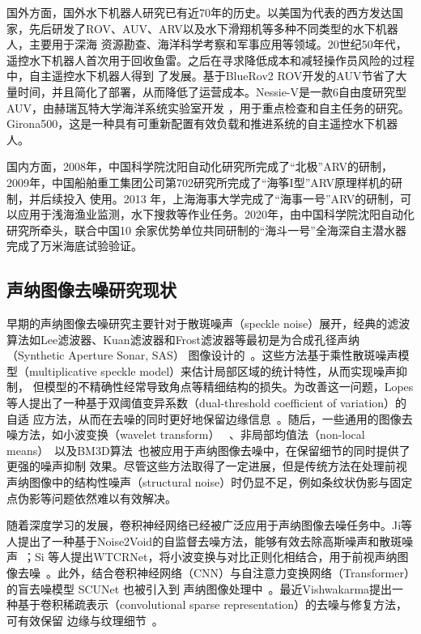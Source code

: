 国外方面，国外水下机器人研究已有近70年的历史。以美国为代表的西方发达国家，先后研发了ROV、AUV、ARV以及水下滑翔机等多种不同类型的水下机器人，主要用于深海
资源勘查、海洋科学考察和军事应用等领域。20世纪50年代，遥控水下机器人首次用于回收鱼雷。之后在寻求降低成本和减轻操作员风险的过程中，自主遥控水下机器人得到
了发展。基于BlueRov2 ROV开发的AUV节省了大量时间，并且简化了部署，从而降低了运营成本。Nessie-V是一款6自由度研究型AUV，由赫瑞瓦特大学海洋系统实验室开发
，用于重点检查和自主任务的研究。Girona500，这是一种具有可重新配置有效负载和推进系统的自主遥控水下机器人。

国内方面，2008年，中国科学院沈阳自动化研究所完成了“北极”ARV的研制，2009年，中国船舶重工集团公司第702研究所完成了“海筝I型”ARV原理样机的研制，并后续投入
使用。2013 年，上海海事大学完成了“海事一号”ARV的研制，可以应用于浅海渔业监测，水下搜救等作业任务。2020年，由中国科学院沈阳自动化研究所牵头，联合中国10
余家优势单位共同研制的“海斗一号”全海深自主潜水器完成了万米海底试验验证。


\subsection{声纳图像去噪研究现状}

早期的声纳图像去噪研究主要针对于散斑噪声（speckle noise）展开，经典的滤波算法如Lee滤波器、Kuan滤波器和Frost滤波器等最初是为合成孔径声纳（Synthetic Aperture Sonar, SAS）
图像设计的~\cite{mascarenhas1997overview}。这些方法基于乘性散斑噪声模型（multiplicative speckle model）来估计局部区域的统计特性，从而实现噪声抑制，
但模型的不精确性经常导致角点等精细结构的损失。为改善这一问题，Lopes等人提出了一种基于双阈值变异系数（dual-threshold coefficient of variation）的自适
应方法，从而在去噪的同时更好地保留边缘信息~\cite{lopes2002adaptive}。随后，一些通用的图像去噪方法，如小波变换（wavelet transform）~\cite{chang2000adaptive}
、非局部均值法（non-local means）~\cite{buades2005non}以及BM3D算法~\cite{dabov2007image}也被应用于声纳图像去噪中，在保留细节的同时提供了更强的噪声抑制
效果。尽管这些方法取得了一定进展，但是传统方法在处理前视声纳图像中的结构性噪声（structural noise）时仍显不足，例如条纹状伪影与固定点伪影等问题依然难以有效解决。

随着深度学习的发展，卷积神经网络已经被广泛应用于声纳图像去噪任务中。Ji等人提出了一种基于Noise2Void的自监督去噪方法，能够有效去除高斯噪声和散斑噪声~\cite{ji2025sonar}；Si
等人提出WTCRNet，将小波变换与对比正则化相结合，用于前视声纳图像去噪~\cite{si2024wtcrnet}。此外，结合卷积神经网络（CNN）与自注意力变换网络（Transformer）的盲去噪模型 SCUNet 也被引入到
声纳图像处理中~\cite{zhang2023practical}。最近Vishwakarma提出一种基于卷积稀疏表示（convolutional sparse representation）的去噪与修复方法，可有效保留
边缘与纹理细节~\cite{vishwakarma2023denoising}。

